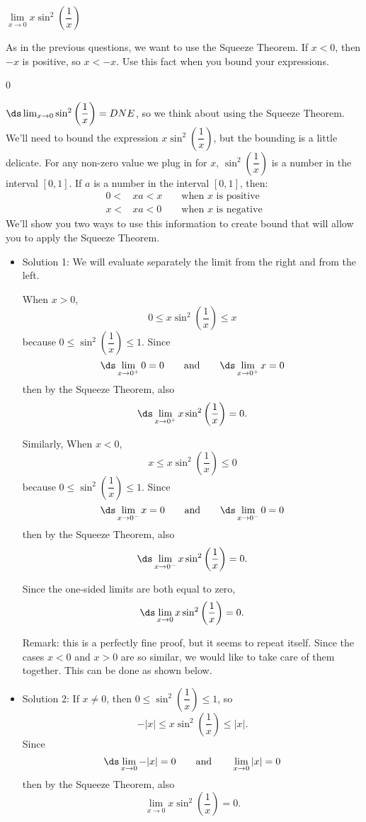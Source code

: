 \begin{question}[2012H]
$\lim\limits_{x\rightarrow 0}x\sin^2\left(\dfrac{1}{x}\right)$
\end{question}
\begin{hint}
As in the previous questions, we want to use the Squeeze Theorem. If $x<0$, then
$-x$ is positive, so
$x<-x$. Use this fact when you bound your expressions.
\end{hint}
\begin{answer}
0
\end{answer}
\begin{solution}
$\ds\lim_{x\to0}\sin^2\left(\dfrac{1}{x}\right)=DNE$,
so we think about using the Squeeze Theorem. We'll need to bound the expression
$x\sin^2\left(\dfrac{1}{x}\right)$, but the bounding is a little delicate.
For any non-zero value we plug in for $x$, $\sin^2\left(\dfrac{1}{x}\right)$ is a number in the interval $[0,1]$. If $a$ is a number in the interval $[0,1]$, then:
\begin{align*}
0<&xa<x & &\mbox{ when $x$ is positive}\\
x<&xa<0 & &\mbox{ when $x$ is negative}
\end{align*}
 We'll show you two ways to use this information to create bound that will allow you to apply the Squeeze Theorem.

\begin{itemize}
\item Solution 1:
We will evaluate separately the limit from the right and from the left.

When $x>0$,
\[0 \leq x\sin^2\left(\dfrac{1}{x}\right) \leq x\]
because $0 \leq \sin^2\left(\dfrac{1}{x}\right) \leq 1$. Since
\[\ds\lim_{x \to 0^+} 0 = 0 \qquad\mbox{and}\qquad \ds\lim_{x \to 0^+}x=0\]
then by the Squeeze Theorem, also
\[\ds\lim_{x \to 0^+} x\sin^2\left(\dfrac{1}{x}\right)=0 .\]

Similarly,
When $x<0$,
\[x \leq x\sin^2\left(\dfrac{1}{x}\right) \leq 0\]
because $0 \leq \sin^2\left(\dfrac{1}{x}\right) \leq 1$. Since
\[\ds\lim_{x \to 0^-} x = 0 \qquad\mbox{and}\qquad \ds\lim_{x \to 0^-}0=0\]
then by the Squeeze Theorem, also
\[\ds\lim_{x \to 0^-} x\sin^2\left(\dfrac{1}{x}\right)=0. \]

Since the one-sided limits are both equal to zero,
\[\ds\lim_{x\to0}x\sin^2\left(\frac{1}{x}\right)=0.\]

Remark: this is a perfectly fine proof, but it seems to repeat itself. Since the cases $x<0$ and $x>0$ are so similar, we would like to take care of them together. This can be done as shown below.
\item Solution 2: If $x\neq 0$, then $0\leq\sin^2\left(\dfrac{1}{x}\right)\leq1$, so
\[-|x| \leq x\sin^2\left(\frac{1}{x}\right)\leq|x|.\]
Since \[\ds\lim_{x \to 0}-|x|=0\qquad\mbox{and}\qquad\lim_{x\to0}|x|=0\]
then by the Squeeze Theorem, also
\[\lim_{x \to 0} x\sin^2\left(\frac{1}{x}\right)=0.\]
\end{itemize}
\end{solution}



